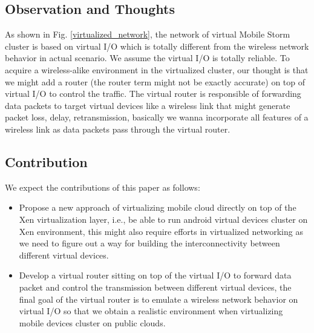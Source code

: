 \documentclass[journal,comsoc]{IEEEtran}
\begin{document}
\subsection{Observation and Thoughts}
As shown in Fig. \ref{virtualized_network}, the network of virtual Mobile Storm cluster is based on virtual I/O which is totally different from the wireless network behavior in actual scenario. We assume the virtual I/O is totally reliable. To acquire a wireless-alike environment in the virtualized cluster, our thought is that we might add a router (the router term might not be exactly accurate) on top of virtual I/O to control the traffic. The virtual router is responsible of forwarding data packets to target virtual devices like a wireless link that might generate packet loss, delay, retransmission, basically we wanna incorporate all features of a wireless link as data packets pass through the virtual router.

\subsection{Contribution}
We expect the contributions of this paper as follows:
\begin{itemize}
	\item Propose a new approach of virtualizing mobile cloud directly on top of the Xen virtualization layer, i.e., be able to run android virtual devices cluster on Xen environment, this might also require efforts in virtualized networking as we need to figure out a way for building the interconnectivity between different virtual devices.
	\item Develop a virtual router sitting on top of the virtual I/O to forward data packet and control the transmission between different virtual devices, the final goal of the virtual router is to emulate a wireless network behavior on virtual I/O so that we obtain a realistic environment when virtualizing mobile devices cluster on public clouds.
\end{itemize}
\end{document}
